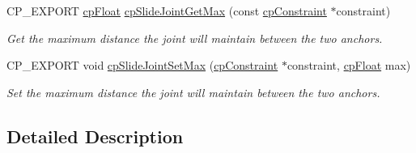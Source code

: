\begin{DoxyCompactItemize}
\mbox{\label{group__cp_slide_joint_ga6c6b89b775f61ac58aa37608869a35c7}} 
C\+P\+\_\+\+E\+X\+P\+O\+RT \mbox{\hyperlink{group__basic_types_gac1ed65573e035bf892505768c852d8d3}{cp\+Float}} \mbox{\hyperlink{group__cp_slide_joint_ga6c6b89b775f61ac58aa37608869a35c7}{cp\+Slide\+Joint\+Get\+Max}} (const \mbox{\hyperlink{structcp_constraint}{cp\+Constraint}} $\ast$constraint)
\begin{DoxyCompactList}\small\item\em Get the maximum distance the joint will maintain between the two anchors. \end{DoxyCompactList}\item 
\mbox{\label{group__cp_slide_joint_ga115742df8d21e9fd150cd54ab0814daf}} 
C\+P\+\_\+\+E\+X\+P\+O\+RT void \mbox{\hyperlink{group__cp_slide_joint_ga115742df8d21e9fd150cd54ab0814daf}{cp\+Slide\+Joint\+Set\+Max}} (\mbox{\hyperlink{structcp_constraint}{cp\+Constraint}} $\ast$constraint, \mbox{\hyperlink{group__basic_types_gac1ed65573e035bf892505768c852d8d3}{cp\+Float}} max)
\begin{DoxyCompactList}\small\item\em Set the maximum distance the joint will maintain between the two anchors. \end{DoxyCompactList}\end{DoxyCompactItemize}


\subsection{Detailed Description}

